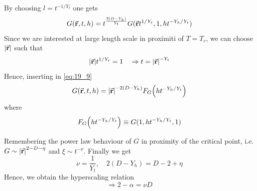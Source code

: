 \documentclass[../main/main.tex]{subfiles}
\begin{document}
By choosing \(   l = t^{-1/Y_t} \) one gets
\begin{equation}
  G (\va{r},t,h) = t^{\frac{2(D-Y_h)}{Y_t}} G (\va{r}t^{1/Y_t}, 1 , h t ^{-Y_h/Y_t})
  \label{eq:19_9}
\end{equation}
Since we are interested at large length scale in proximiti of \( T=T_c \), we can choose \( \abs{\va{r}}  \) such that
\begin{equation}
  \abs{\va{r}} t^{1/Y_t} = 1  \quad \Rightarrow  t = \abs{\va{r}}^{-Y_t}
\end{equation}
Hence, inserting in \eqref{eq:19_9}
\begin{equation}
  G (\va{r},t,h) = \abs{\va{r}}^{-2(D-Y_h)} F_G \qty(h t^{-Y_h/Y_t})
\end{equation}
where
\begin{equation}
  F_G \qty(h t^{-Y_h/Y_t})  \equiv G (1, h t ^{-Y_h/Y_t},1)
\end{equation}

Remembering the power law behaviour of \( G \) in proximity of the critical point, i.e.  \( G \sim \abs{\va{r}}^{2-D- \eta }  \) and \( \xi \sim t^{-\nu } \).
Finally we get
\begin{equation}
  \nu = \frac{1}{Y_t}, \quad 2 (D- Y_h) = D - 2 + \eta
\end{equation}
Hence, we obtain the hyperscaling relation
\begin{equation}
      \Rightarrow 2 - \alpha = \nu D
\end{equation}
\end{document}
